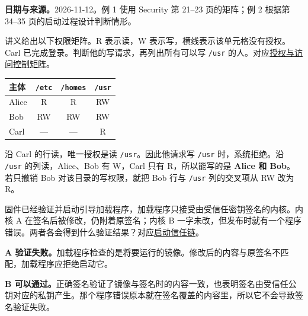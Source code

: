 \begingroup
\renewcommand{\recordid}[1]{}
\renewcommand{\relatedtopic}[2]{\hyperref[topic:#1]{#2}}

\textbf{日期与来源。}2026-11-12。例 1 使用 Security 第 21--23 页的矩阵；例 2 根据第 34--35 页的启动过程设计判断情形。

\linespread{1.15}\selectfont
\setlength{\parskip}{0.4em}

讲义给出以下权限矩阵。R 表示读，W 表示写，横线表示该单元格没有授权。Carl 已完成登录。判断他的写请求，再列出所有可以写 \texttt{/usr} 的人。对应\relatedtopic{SC2005-L24-T02}{授权与访问控制矩阵}。

\begin{center}
\begin{tabular}{@{}lccc@{}}
\toprule
主体 & \texttt{/etc} & \texttt{/homes} & \texttt{/usr} \\
\midrule
Alice & R  & R  & RW \\
Bob   & RW & RW & RW \\
Carl  & --- & --- & R \\
\bottomrule
\end{tabular}
\end{center}

\begin{workedsolution}
沿 Carl 的行读，唯一授权是读 \texttt{/usr}。因此他请求写 \texttt{/usr} 时，系统拒绝。沿 \texttt{/usr} 的列读，Alice、Bob 有 W，Carl 只有 R，所以能写的是 \textbf{Alice 和 Bob}。若只撤销 Bob 对该目录的写权限，就把 Bob 行与 \texttt{/usr} 列的交叉项从 RW 改为 R。
\end{workedsolution}

固件已经验证并启动引导加载程序，加载程序只接受由受信任密钥签名的内核。内核 A 在签名后被修改，仍附着原签名；内核 B 一字未改，但发布时就有一个程序错误。两者各会得到什么验证结果？对应\relatedtopic{SC2005-L24-T04}{启动信任链}。

\begin{workedsolution}
\textbf{A 验证失败。}加载程序检查的是将要运行的镜像。修改后的内容与原签名不匹配，加载程序应拒绝启动它。

\textbf{B 可以通过。}正确签名验证了镜像与签名时的内容一致，也表明签名由受信任公钥对应的私钥产生。那个程序错误原本就在签名覆盖的内容里，所以它不会导致签名验证失败。
\end{workedsolution}
\endgroup
